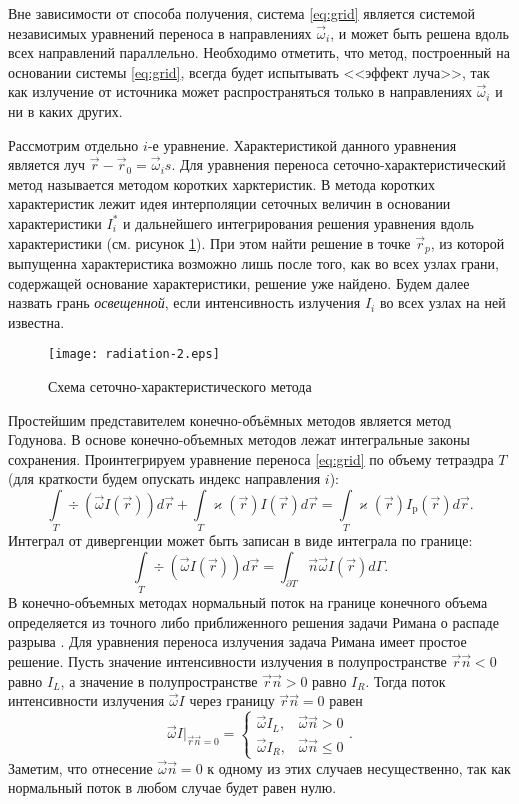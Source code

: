 Вне зависимости от способа получения, система \eqref{eq:grid} является системой независимых уравнений переноса в направлениях $\vec \omega_i$, и может быть решена вдоль всех направлений параллельно. Необходимо отметить, что метод, построенный на основании системы \eqref{eq:grid}, всегда будет испытывать <<эффект луча>>, так как излучение от источника может распространяться только в направлениях $\vec \omega_i$ и ни в каких других.



Рассмотрим отдельно $i$-е уравнение. Характеристикой данного уравнения является луч $\vec r - \vec r_0 = \vec \omega_i s$. 
Для уравнения переноса сеточно-характеристический метод называется методом коротких харктеристик. В метода коротких характеристик лежит идея интерполяции сеточных величин в основании характеристики $I_i^*$ и дальнейшего интегрирования решения уравнения вдоль характеристики (см. рисунок \ref{fig:char}). При этом найти решение в точке $\vec r_p$, из которой выпущенна характеристика возможно лишь после того, как во всех узлах грани, содержащей основание характеристики, решение уже найдено. Будем далее назвать грань \emph{освещенной}, если интенсивность излучения $I_i$ во всех узлах на ней известна.
\begin{figure}[ht!]
\centering
\texttt{[image: radiation-2.eps]}
\caption{Схема сеточно-характеристического метода}
\label{fig:char}
\end{figure}

Простейшим представителем конечно-объёмных методов является метод Годунова. В основе конечно-объемных методов лежат интегральные законы сохранения. Проинтегрируем уравнение переноса
\eqref{eq:grid} по объему тетраэдра $T$ (для краткости будем опускать индекс направления $i$):
\[
\int\limits_T \div (\vec \omega I(\vec r))  d\vec r + \int\limits_T \varkappa(\vec r) I(\vec r)  d\vec r = \int\limits_T \varkappa(\vec r) I_\text{p}(\vec r)  d\vec r.
\]
Интеграл от дивергенции может быть записан в виде интеграла по границе:
\[
\int\limits_T \div (\vec \omega I(\vec r)) d\vec r= \int_{\partial T} \vec n \vec \omega I(\vec r) d\Gamma.
\]
В конечно-объемных методах нормальный поток на границе конечного объема определяется из точного либо приближенного решения задачи Римана о распаде разрыва \cite{Kulikovskiy}.
Для уравнения переноса излучения задача Римана имеет простое решение. Пусть значение интенсивности излучения в полупространстве $\vec r \vec n < 0$ равно $I_L$, а значение в полупространстве $\vec r \vec n > 0$ равно $I_R$. Тогда поток интенсивности излучения $\vec \omega I$ через границу $\vec r \vec n = 0$ равен
\[
\vec \omega I\big|_{\vec r \vec n = 0} = 
\begin{cases}
\vec \omega I_L, &\vec \omega \vec n > 0\\
\vec \omega I_R, &\vec \omega \vec n \leq 0
\end{cases}.
\] 
Заметим, что отнесение $\vec \omega \vec n = 0$ к одному из этих случаев несущественно, так как нормальный поток в любом случае будет равен нулю.

